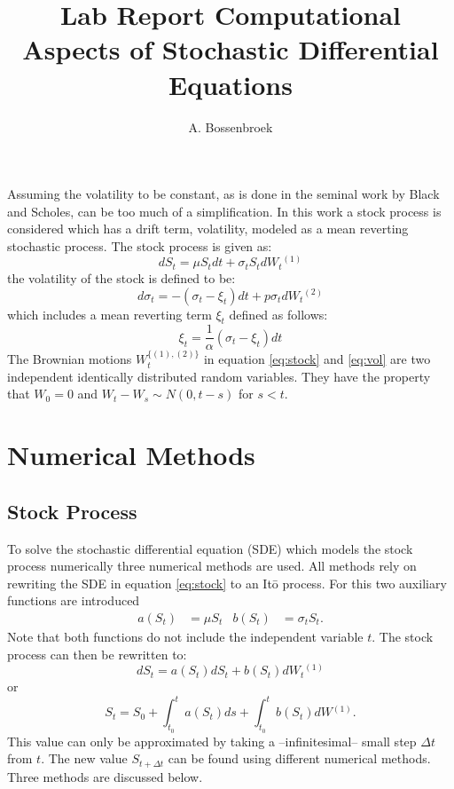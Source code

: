 \documentclass[a4paper,onecolumn]{IEEEtran}
\author{A. Bossenbroek}
\title{Lab Report Computational Aspects of Stochastic Differential Equations}
\begin{document}
\maketitle
Assuming the volatility to be constant, as is done in the seminal work by Black
and Scholes, can be too much of a simplification. In this work a stock process
is considered which has a drift term, volatility, modeled as a mean reverting
stochastic process. The stock process is given as:
\newcommand{\indst}{\ensuremath{^{(1)}}}
\newcommand{\indvl}{\ensuremath{^{(2)}}}
\begin{equation}\label{eq:stock}
dS_t = \mu S_t dt + \sigma_t S_t dW_t\indst
\end{equation}
the volatility of the stock is defined to be:
\begin{equation}\label{eq:vol}
d\sigma_t = -(\sigma_t - \xi_t)dt + p\sigma_t dW_t\indvl
\end{equation}
which includes a mean reverting term $\xi_t$ defined as follows:
\begin{equation}\label{eq:mnrvrt}
\xi_t = \frac{1}{\alpha}(\sigma_t - \xi_t)dt
\end{equation}
The Brownian motions $W_t^{\{(1), (2)\}}$ in  equation \eqref{eq:stock} and
\eqref{eq:vol} are two independent identically distributed random variables.
They have the property that $W_0=0$ and $W_t - W_s \sim N(0, t - s)$ for $s <
t$.

\section{Numerical Methods}
\subsection{Stock Process}
To solve the stochastic differential equation (SDE) which models the stock 
process numerically three numerical methods are used. All methods rely on
rewriting the SDE in equation \eqref{eq:stock} to an It\=o process. For this two
auxiliary functions are introduced 
\begin{align}\label{eq:abstck}
a(S_t)&=\mu S_t&b(S_t)&=\sigma_t S_t.
\end{align}
Note that both functions do not include the independent variable $t$.  The
stock process can then be rewritten to:
\newcommand{\inttim}{\ensuremath{\int_{t_0}^{t}}}
\newcommand{\intdel}{\ensuremath{\int_{t}^{t + \Delta t}}}
\begin{equation*}
dS_t = a(S_t)dS_t + b(S_t)dW_t\indst
\end{equation*}
or
\begin{equation*}
S_t = S_0 + \inttim a(S_t)ds + \inttim b(S_t)dW\indst.
\end{equation*}
This value can only be approximated by taking a --infinitesimal-- small step
$\Delta t$ from $t$. The new value $S_{t + \Delta t}$ can be found using
different numerical methods. Three methods are discussed below.
\end{document}
